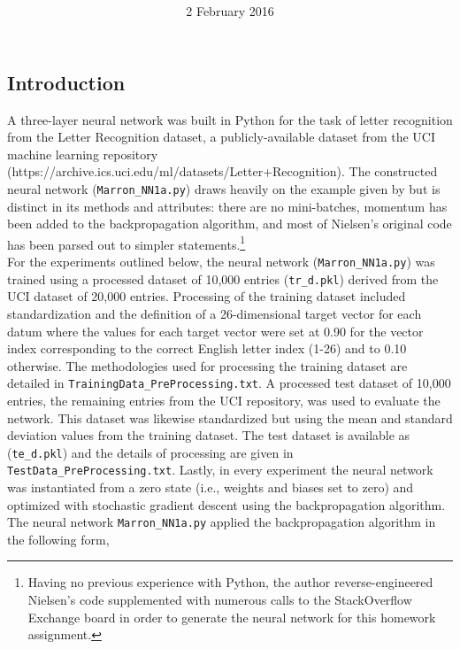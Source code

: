 \documentclass[12pt]{article}
\title{
\vspace{2in}
\textmd{\textbf{\hmwkTitle}}\\
\textit{\normalsize \hmwkClass}
\vspace{3in}
}
\author{\textbf{\hmwkAuthorName}}
\date{2 February 2016} %
\begin{document}
\maketitle
\thispagestyle{empty}
\clearpage\maketitle

\subsection{Introduction}
A three-layer neural network was built in Python for the task of letter recognition from the Letter Recognition dataset, a publicly-available dataset from the UCI machine learning repository (https://archive.ics.uci.edu/ml/datasets/Letter+Recognition). The constructed neural network (\verb|Marron_NN1a.py|) draws heavily on the example given by  but is distinct in its methods and attributes: there are no mini-batches, momentum has been added to the backpropagation algorithm, and most of Nielsen's original code has been parsed out to simpler statements.\footnote{Having no previous experience with Python, the author reverse-engineered Nielsen's code supplemented with numerous calls to the StackOverflow Exchange board in order to generate the neural network for this homework assignment.}\\

For the experiments outlined below, the neural network (\verb|Marron_NN1a.py|) was trained using a processed dataset of 10,000 entries (\verb|tr_d.pkl|) derived from the UCI dataset of 20,000 entries. Processing of the training dataset included standardization and the definition of a 26-dimensional target vector for each datum where the values for each target vector were set at 0.90 for the vector index corresponding to the correct English letter index (1-26) and to 0.10 otherwise.  The methodologies used for processing the training dataset are detailed in \verb|TrainingData_PreProcessing.txt|. A processed test dataset of 10,000 entries, the remaining entries from the UCI repository, was used to evaluate the network. This dataset was likewise standardized but using the mean and standard deviation values from the training dataset. The test dataset is available as (\verb|te_d.pkl|) and the details of processing are given in \verb|TestData_PreProcessing.txt|. Lastly, in every experiment the neural network was instantiated from a zero state (i.e., weights and biases set to zero) and optimized with stochastic gradient descent using the backpropagation algorithm. The neural network \verb|Marron_NN1a.py| applied the backpropagation algorithm in the following form,\\
\end{document}
